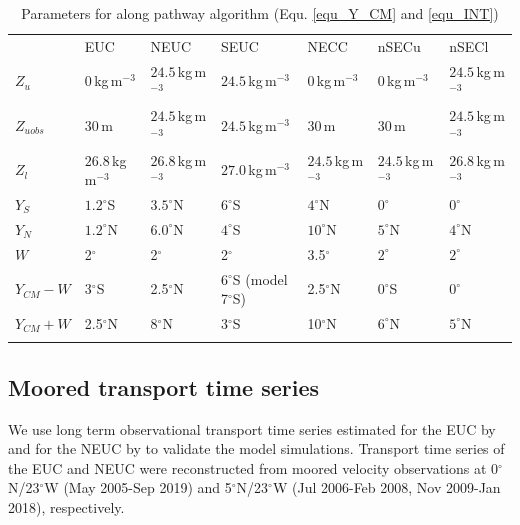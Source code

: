 \documentclass[os, manuscript]{copernicus}
\begin{document}
\begin{table}[t]
	\caption{Parameters for along pathway algorithm (Equ. \ref{equ_Y_CM} and \ref{equ_INT})}
	\begin{tabular}{lllllll}
		\tophline
		& EUC & NEUC & SEUC & NECC & nSECu & nSECl \\
		\middlehline
		$ Z_{u} $ & $0\,$kg$\,$m$^{-3}$ & $24.5\,$kg$\,$m$^{-3}$ & $24.5\,$kg$\,$m$^{-3}$ & $0\,$kg$\,$m$^{-3}$ & $0\,$kg$\,$m$^{-3}$  & $24.5\,$kg$\,$m$^{-3}$\\
		$ Z_{u obs} $ & $30\,$m & $24.5\,$kg$\,$m$^{-3}$ & $24.5\,$kg$\,$m$^{-3}$ & $30\,$m & $30\,$m  & $24.5\,$kg$\,$m$^{-3}$\\
		$ Z_{l} $ & $26.8\,$kg$\,$m$^{-3}$ & $26.8\,$kg$\,$m$^{-3}$ & $27.0\, $kg$\,$m$^{-3}$ & $24.5\,$kg$\,$m$^{-3}$ & $24.5\,$kg$\,$m$^{-3}$ & $26.8\,$kg$\,$m$^{-3}$ \\
		$ Y_{S} $ & $1.2^{\circ}$S & $3.5^{\circ}$N & $6^{\circ}$S & $4^{\circ}$N & $0^{\circ}$ & $0^{\circ}$ \\
		$ Y_{N} $ & $1.2^{\circ}$N & $6.0^{\circ}$N & $4^{\circ}$S & $10^{\circ}$N & $5^{\circ}$N & $4^{\circ}$N \\
		$ W $ & 2$^{\circ}$ & 2$^{\circ}$ & 2$^{\circ}$ & 3.5$^{\circ}$ & $2^{\circ}$ & $2^{\circ}$ \\
		$ Y_{CM}-W $ & 3$^{\circ}$S & 2.5$^{\circ}$N & 6$^{\circ}$S (model 7$^{\circ}$S) & 2.5$^{\circ}$N& $0^{\circ}$S & $0 ^{\circ}$ \\
		$ Y_{CM}+W $ & 2.5$^{\circ}$N & 8$^{\circ}$N & 3$^{\circ}$S & 10$^{\circ}$N & $6^{\circ}$N & $5 ^{\circ}$N \\
		\bottomhline
	\end{tabular}
	\label{tab_boundary_conditions}
\end{table}


\subsection{Moored transport time series}
We use long term observational transport time series estimated for the EUC by \cite{Brandt2021a,Brandt2014} and for the NEUC by \cite{Burmeister2020} to validate the model simulations. Transport time series of the EUC and NEUC were reconstructed from moored velocity observations at 0$ ^{\circ} $N/23$ ^{\circ} $W (May 2005-Sep 2019) and 5$ ^{\circ} $N/23$ ^{\circ} $W (Jul 2006-Feb 2008, Nov 2009-Jan 2018), respectively. 
\end{document}
